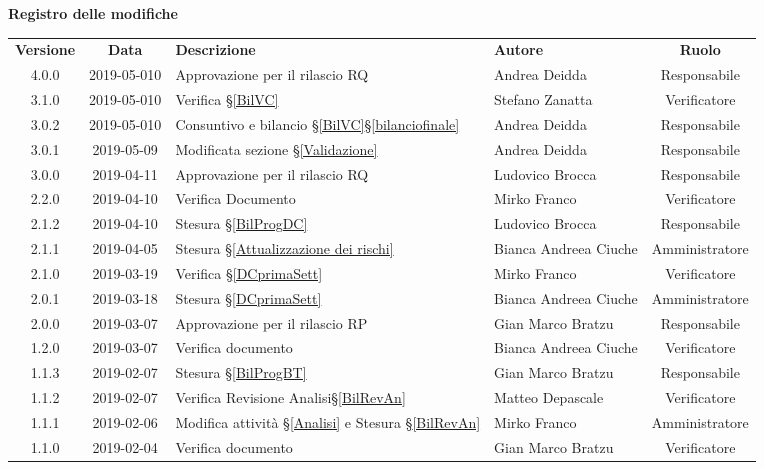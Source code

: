 	\begin{center}
		\textbf{Registro delle modifiche}
	\end{center}
	\begin{center}
		\begin{tabularx}{\textwidth}{|c|c|X|X|c|}
			\hline
			\textbf{Versione} & \textbf{Data} & \textbf{Descrizione} & \textbf{Autore} & \textbf{Ruolo} \\
			4.0.0 & 2019-05-010 & Approvazione per il rilascio RQ & Andrea Deidda & Responsabile \\
			\hline
			3.1.0 & 2019-05-010 & Verifica \S\ref{BilVC} & Stefano Zanatta & Verificatore \\
			\hline
			3.0.2 & 2019-05-010 & Consuntivo e bilancio \S\ref{BilVC}\S\ref{bilanciofinale} & Andrea Deidda & Responsabile \\
			\hline
			3.0.1 & 2019-05-09 & Modificata sezione \S\ref{Validazione} & Andrea Deidda & Responsabile \\
			\hline
			3.0.0 &2019-04-11&Approvazione per il rilascio RQ & Ludovico Brocca & Responsabile\\
			\hline
			2.2.0 &2019-04-10&Verifica Documento& Mirko Franco & Verificatore\\
			\hline
			2.1.2 &2019-04-10&Stesura \S\ref{BilProgDC}& Ludovico Brocca & Responsabile\\
			\hline
			2.1.1 & 2019-04-05 & Stesura  \S\ref{Attualizzazione dei rischi} & Bianca Andreea Ciuche & Amministratore \\		
			\hline
			2.1.0 &2019-03-19&Verifica  \S\ref{DCprimaSett}& Mirko Franco & Verificatore\\
			\hline
			2.0.1 & 2019-03-18 & Stesura  \S\ref{DCprimaSett} & Bianca Andreea Ciuche & Amministratore \\
			\hline
			2.0.0 & 2019-03-07 & Approvazione per il rilascio RP & Gian Marco Bratzu & Responsabile \\
			\hline
			1.2.0 & 2019-03-07 & Verifica documento & Bianca Andreea Ciuche & Verificatore \\
			\hline
			1.1.3 & 2019-02-07 & Stesura \S\ref{BilProgBT} & Gian Marco Bratzu & Responsabile \\
			\hline
			1.1.2 & 2019-02-07 & Verifica Revisione Analisi\S\ref{BilRevAn} & Matteo Depascale & Verificatore \\
			\hline
			1.1.1 & 2019-02-06 & Modifica attività \S\ref{Analisi} e Stesura \S\ref{BilRevAn} & Mirko Franco & Amministratore \\
			\hline
			1.1.0 & 2019-02-04 & Verifica documento & Gian Marco Bratzu & Verificatore\\

\end{tabularx}
\end{center}
